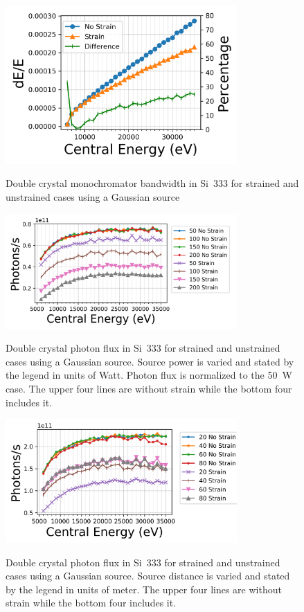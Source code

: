 \documentclass[preprint]{iucr}              %
\begin{document}
\begin{figure}
\caption{Double crystal monochromator bandwidth in Si~333 for strained and unstrained cases using a Gaussian source}
\includegraphics[width = 8.85cm]{images/333monobw.png}
\label{fig:333monobw}
\end{figure}

\begin{figure}
\caption{Double crystal photon flux in Si~333 for strained and unstrained cases using a Gaussian source. Source power is varied and stated by the legend in units of Watt. Photon flux is normalized to the 50~W case. The upper four lines are without strain while the bottom four includes it.}
\includegraphics[width = 8.85cm]{images/333strainpower.png}
\label{fig:333strainpower}
\end{figure}


\begin{figure}
\caption{Double crystal photon flux in Si~333 for strained and unstrained cases using a Gaussian source. Source distance is varied and stated by the legend in units of meter. The upper four lines are without strain while the bottom four includes it.}
\includegraphics[width = 8.85cm]{images/333straindistance.png}
\label{fig:333straindistance}
\end{figure}
\end{document}
